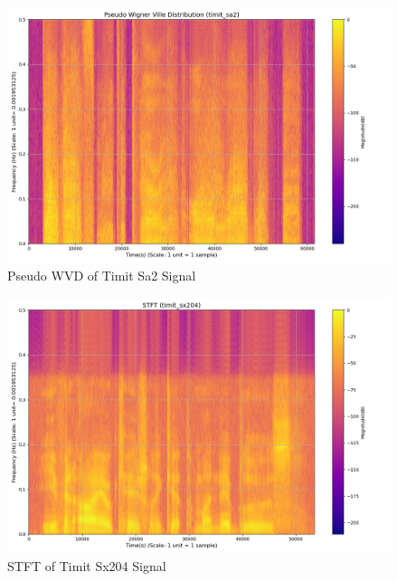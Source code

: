 \documentclass[12pt,a4paper,onecolumn]{exam}
\begin{document}
\begin{solution}
        \begin{figure}[H]
        \centering
        \includegraphics[scale = 0.35]{timit_sa2_pwvd.png}
        \caption{Pseudo WVD of Timit Sa2 Signal}
        \label{fig:54}
        \end{figure}      

        \begin{figure}[H]
        \centering
        \includegraphics[scale = 0.35]{timit_sx204_stft.png}
        \caption{STFT of Timit Sx204 Signal}
        \label{fig:55}
        \end{figure}


\end{solution}
\end{document}
